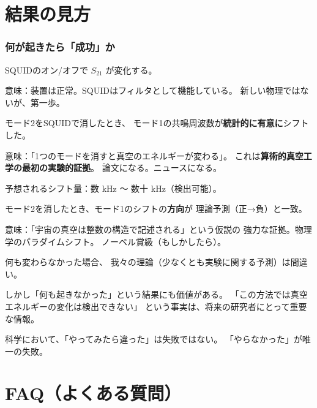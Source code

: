 \documentclass[12pt,a4paper]{article}
\begin{document}
\part{結果の見方}

\section{何が起きたら「成功」か}

\begin{tukurubox}
SQUIDのオン/オフで $S_{21}$ が変化する。

意味：装置は正常。SQUIDはフィルタとして機能している。
新しい物理ではないが、第一歩。
\end{tukurubox}

\begin{tukurubox}
モード2をSQUIDで消したとき、
モード1の共鳴周波数が\textbf{統計的に有意に}シフトした。

意味：「1つのモードを消すと真空のエネルギーが変わる」。
これは\textbf{算術的真空工学の最初の実験的証拠}。
論文になる。ニュースになる。

予想されるシフト量：数 kHz 〜 数十 kHz（検出可能）。
\end{tukurubox}

\begin{tukurubox}
モード2を消したとき、モード1のシフトの\textbf{方向}が
理論予測（正→負）と一致。

意味：「宇宙の真空は整数の構造で記述される」という仮説の
強力な証拠。物理学のパラダイムシフト。
ノーベル賞級（もしかしたら）。
\end{tukurubox}

\begin{honestbox}[何が起きたら「失敗」か]
何も変わらなかった場合、
我々の理論（少なくとも実験に関する予測）は間違い。

しかし「何も起きなかった」という結果にも価値がある。
「この方法では真空エネルギーの変化は検出できない」
という事実は、将来の研究者にとって重要な情報。

科学において、「やってみたら違った」は失敗ではない。
「やらなかった」が唯一の失敗。
\end{honestbox}

\part{FAQ（よくある質問）}
\end{document}

